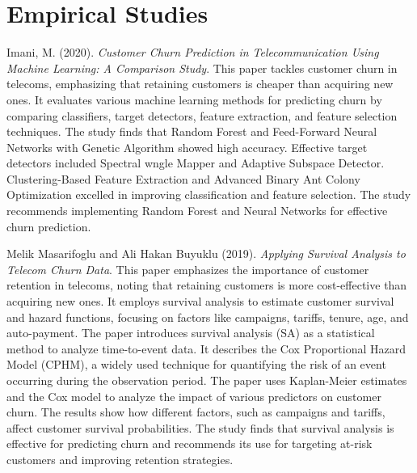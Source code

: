 \documentclass[doublespacing]{report} [12px]%
\begin{document}
\section{Empirical Studies}
Imani, M. (2020). \textit{Customer Churn Prediction in Telecommunication Using Machine Learning: A Comparison Study}. This paper tackles customer churn in telecoms, emphasizing that retaining customers is cheaper than acquiring new ones. It evaluates various machine learning methods for predicting churn by comparing classifiers, target detectors, feature extraction, and feature selection techniques. The study finds that Random Forest and Feed-Forward Neural Networks with Genetic Algorithm showed high accuracy. Effective target detectors included Spectral wngle Mapper and Adaptive Subspace Detector. Clustering-Based Feature Extraction and Advanced Binary Ant Colony Optimization excelled in improving classification and feature selection. The study recommends implementing Random Forest and Neural Networks for effective churn prediction.

Melik Masarifoglu and Ali Hakan Buyuklu (2019). \textit{Applying Survival Analysis to Telecom Churn Data}. This paper emphasizes the importance of customer retention in telecoms, noting that retaining customers is more cost-effective than acquiring new ones. It employs survival analysis to estimate customer survival and hazard functions, focusing on factors like campaigns, tariffs, tenure, age, and auto-payment. The paper introduces survival analysis (SA) as a statistical method to analyze time-to-event data. It describes the Cox Proportional Hazard Model (CPHM), a widely used technique for quantifying the risk of an event occurring during the observation period. The paper uses Kaplan-Meier estimates and the Cox model to analyze the impact of various predictors on customer churn. The results show how different factors, such as campaigns and tariffs, affect customer survival probabilities. The study finds that survival analysis is effective for predicting churn and recommends its use for targeting at-risk customers and improving retention strategies.
\end{document}
